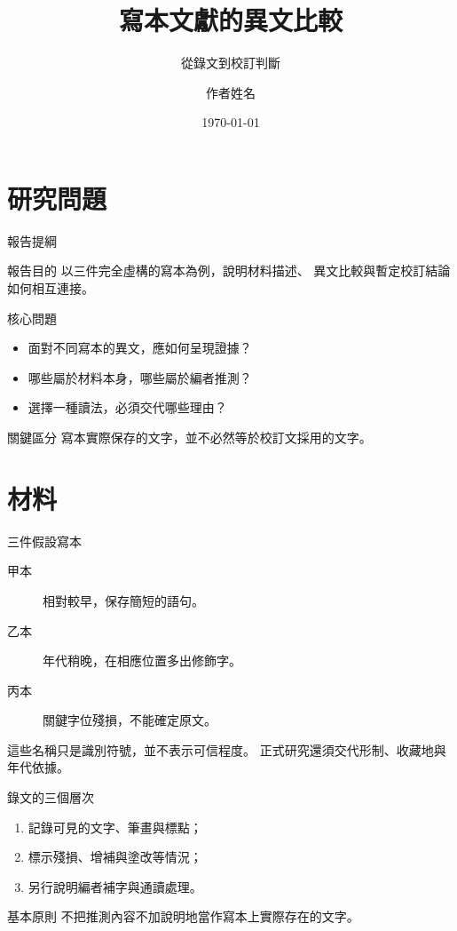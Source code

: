 \documentclass[lang=zh]{impebeamer}
\title{寫本文獻的異文比較}
\subtitle{從錄文到校訂判斷}
\author{作者姓名}
\date{\today}
\begin{document}
\begin{frame}
  \titlepage
\end{frame}

\section{研究問題}
\begin{frame}{報告提綱}
  \tableofcontents
  \medskip
  \begin{block}{報告目的}
    以三件完全虛構的寫本為例，說明材料描述、
    異文比較與暫定校訂結論如何相互連接。
  \end{block}
\end{frame}

\begin{frame}{核心問題}
  \begin{itemize}
    \item 面對不同寫本的異文，應如何呈現證據？
    \item 哪些屬於材料本身，哪些屬於編者推測？
    \item 選擇一種讀法，必須交代哪些理由？
  \end{itemize}
  \begin{alertblock}{關鍵區分}
    寫本實際保存的文字，並不必然等於校訂文採用的文字。
  \end{alertblock}
\end{frame}

\section{材料}
\begin{frame}{三件假設寫本}
  \begin{description}
    \item[甲本] 相對較早，保存簡短的語句。
    \item[乙本] 年代稍晚，在相應位置多出修飾字。
    \item[丙本] 關鍵字位殘損，不能確定原文。
  \end{description}
  \medskip
  這些名稱只是識別符號，並不表示可信程度。
  正式研究還須交代形制、收藏地與年代依據。
\end{frame}

\begin{frame}{錄文的三個層次}
  \begin{enumerate}
    \item 記錄可見的文字、筆畫與標點；
    \item 標示殘損、增補與塗改等情況；
    \item 另行說明編者補字與通讀處理。
  \end{enumerate}
  \medskip
  \begin{block}{基本原則}
    不把推測內容不加說明地當作寫本上實際存在的文字。
  \end{block}
\end{frame}
\end{document}
